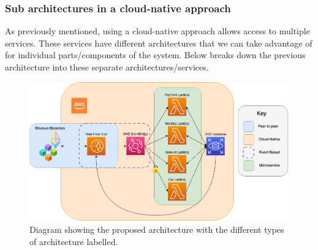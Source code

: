   \newpage
  \subsubsection{Sub architectures in a cloud-native approach}
  As previously mentioned, using a cloud-native approach allows access to multiple services. These services have different architectures that we can take
  advantage of for individual parts/components of the system. Below breaks down the previous architecture into these separate architectures/services.

  \begin{figure}[H]
    \centering
    \includegraphics[width=12cm]{assets/architectureSectionedEvents.drawio.png}
    \caption{Diagram showing the proposed architecture with the different types of architecture labelled.}
    \label{fig:architectureSectioned}
  \end{figure}


